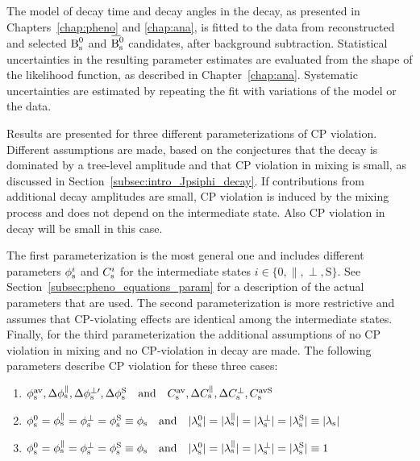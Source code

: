 The model of decay time and decay angles in the \BstoJpsiKK{} decay, as presented in Chapters~\ref{chap:pheno} and \ref{chap:ana}, is
fitted to the data from reconstructed and selected $\Bs$ and $\Bsbar$ candidates, after background subtraction. Statistical uncertainties
in the resulting parameter estimates are evaluated from the shape of the likelihood function, as described in Chapter~\ref{chap:ana}.
Systematic uncertainties are estimated by repeating the fit with variations of the model or the data.

Results are presented for three different parameterizations of CP violation. Different assumptions are made, based on the conjectures that
the \BstoJpsiKK{} decay is dominated by a tree-level amplitude and that CP violation in mixing is small, as discussed in
Section~\ref{subsec:intro_Jpsiphi_decay}. If contributions from additional decay amplitudes are small, CP violation is induced by the
\BsBsbar{} mixing process and does not depend on the intermediate state. Also CP violation in decay will be small in this case.

The first parameterization is the most general one and includes different parameters $\phisi$ and $\Csi$ for the intermediate states
$i\in\{\text{0}, \parallel, \perp, \text{S}\}$. See Section~\ref{subsec:pheno_equations_param} for a description of the actual parameters
that are used. The second parameterization is more restrictive and assumes that CP-violating effects are identical among the intermediate
states. Finally, for the third parameterization the additional assumptions of no CP violation in mixing and no CP-violation in decay are
made. The following parameters describe CP violation for these three cases:
\begin{enumerate}
  \item $\phisav,\Delphispara,\Delphisperpp,\DelphisS
         \quad\text{and}\quad\Csav,\DelCspara,\DelCsperp,\CsavS$
  \item $\phisi[\text{0}]=\phisi[\parallel]=\phisi[\perp]=\phisi[\text{S}]\equiv\phis
         \quad\text{and}\quad\lamsiAbs[\text{0}]=\lamsiAbs[\parallel]=\lamsiAbs[\perp]=\lamsiAbs[\text{S}]\equiv\lamsAbs$
  \item $\phisi[\text{0}]=\phisi[\parallel]=\phisi[\perp]=\phisi[\text{S}]\equiv\phis
         \quad\text{and}\quad\lamsiAbs[\text{0}]=\lamsiAbs[\parallel]=\lamsiAbs[\perp]=\lamsiAbs[\text{S}]\equiv1$
\end{enumerate}

